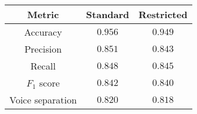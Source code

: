 \begin{tabular}{ccc}
    \textbf{Metric}  & \textbf{Standard} & \textbf{Restricted} \\\hline
    Accuracy         & $\mathbf{0.956}$  & $0.949$             \\
    Precision        & $\mathbf{0.851}$  & $0.843$             \\
    Recall           & $\mathbf{0.848}$  & $0.845$             \\
    $F_1$ score      & $\mathbf{0.842}$  & $0.840$             \\
    Voice separation & $\mathbf{0.820}$  & $0.818$             \\
\end{tabular}
